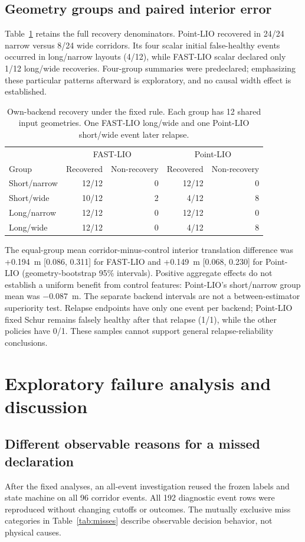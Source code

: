 \documentclass[11pt,a4paper]{article}
\begin{document}
\subsection{Geometry groups and paired interior error}
Table~\ref{tab:groups} retains the full recovery denominators. Point-LIO
recovered in 24/24 narrow versus 8/24 wide corridors. Its four scalar
initial false-healthy events occurred in long/narrow layouts (4/12), while
FAST-LIO scalar declared only 1/12 long/wide recoveries. Four-group summaries
were predeclared; emphasizing these particular patterns afterward is
exploratory, and no causal width effect is established.

\begin{table}[htbp]
\centering\small
\begin{tabular}{@{}lrrrr@{}}
\toprule & \multicolumn{2}{c}{FAST-LIO} & \multicolumn{2}{c}{Point-LIO}\\
Group & Recovered & Non-recovery & Recovered & Non-recovery\\\midrule
Short/narrow & 12/12 & 0 & 12/12 & 0\\
Short/wide & 10/12 & 2 & 4/12 & 8\\
Long/narrow & 12/12 & 0 & 12/12 & 0\\
Long/wide & 12/12 & 0 & 4/12 & 8\\\bottomrule
\end{tabular}
\caption{Own-backend recovery under the fixed rule. Each group has 12 shared
input geometries. One FAST-LIO long/wide and one Point-LIO short/wide event
later relapse.}\label{tab:groups}
\end{table}

The equal-group mean corridor-minus-control interior translation difference
was +0.194~m [0.086, 0.311] for FAST-LIO and +0.149~m [0.068, 0.230] for
Point-LIO (geometry-bootstrap 95\% intervals). Positive aggregate effects
do not establish a uniform benefit from control features: Point-LIO's
short/narrow group mean was $-0.087$~m. The separate backend intervals are
not a between-estimator superiority test. Relapse endpoints have only one
event per backend; Point-LIO fixed Schur remains falsely healthy after that
relapse (1/1), while the other policies have 0/1. These samples cannot
support general relapse-reliability conclusions.

\section{Exploratory failure analysis and discussion}
\subsection{Different observable reasons for a missed declaration}
After the fixed analyses, an all-event investigation reused the frozen
labels and state machine on all 96 corridor events. All 192 diagnostic event
rows were reproduced without changing cutoffs or outcomes. The mutually
exclusive miss categories in Table~\ref{tab:misses} describe observable
decision behavior, not physical causes.
\end{document}
